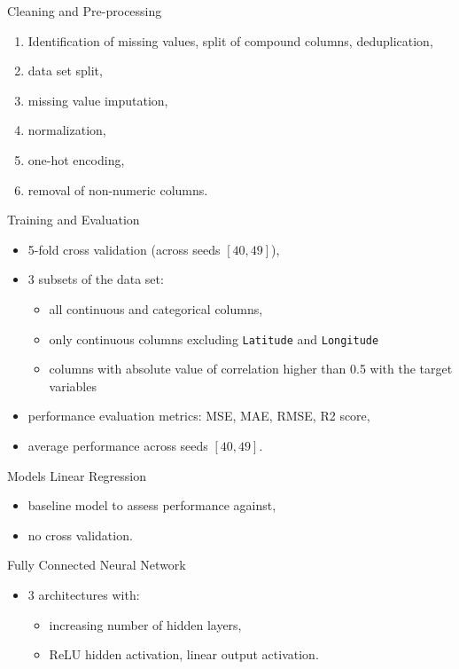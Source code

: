 \documentclass[xcolor=table]{beamer} %
\begin{document}
\begin{frame}{Cleaning and Pre-processing}
  \vspace{-1cm}
  \begin{enumerate}
      \item Identification of missing values, split of compound columns, deduplication,
      \item data set split,
      \item missing value imputation,
      \item normalization,
      \item one-hot encoding,
      \item removal of non-numeric columns.
  \end{enumerate}
\end{frame}

\begin{frame}{Training and Evaluation}
  \vspace{-1cm}
  \begin{itemize}
      \item 5-fold cross validation (across seeds $[40, 49]$),
      \item 3 subsets of the data set:
        \begin{itemize}
            \item all continuous and categorical columns,
            \item only continuous columns excluding \texttt{Latitude} and \texttt{Longitude}
            \item columns with absolute value of correlation higher than 0.5 with the target variables
        \end{itemize}
      \item performance evaluation metrics: MSE, MAE, RMSE, R2 score,
      \item average performance across seeds $[40, 49]$.
  \end{itemize}
\end{frame}

\begin{frame}{Models}
  \vspace{-0.5cm}
  Linear Regression
  \begin{itemize}
      \item baseline model to assess performance against,
      \item no cross validation.
  \end{itemize}
  Fully Connected Neural Network
  \begin{itemize}
      \item 3 architectures with:
        \begin{itemize}
            \item increasing number of hidden layers,
            \item ReLU hidden activation, linear output activation.
        \end{itemize}
  \end{itemize}
\end{frame}
\end{document}
